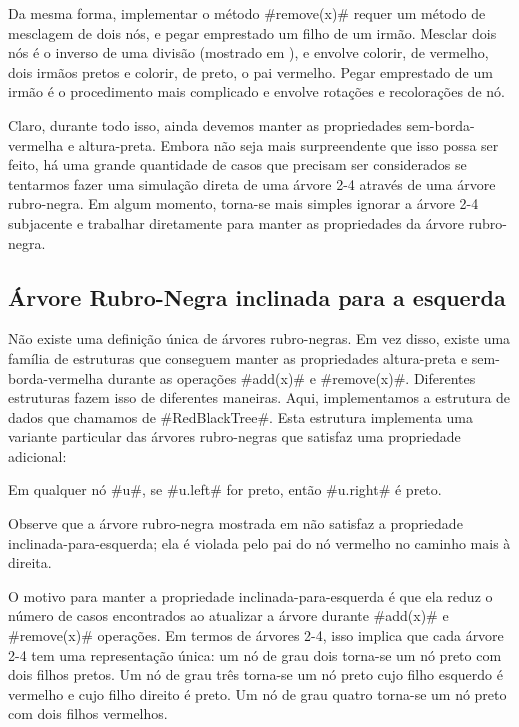 Da mesma forma, implementar o método #remove(x)# requer um método de mesclagem 
de dois nós, e pegar emprestado um filho de um irmão. Mesclar dois nós é o inverso de
uma divisão (mostrado em ), e envolve colorir, de vermelho, dois
irmãos pretos e colorir, de preto, o pai vermelho. Pegar emprestado de
um irmão é o procedimento mais complicado e envolve
rotações e recolorações de nó.

Claro, durante todo isso, ainda devemos manter as propriedades sem-borda-vermelha
e altura-preta. Embora não seja mais surpreendente que isso possa ser feito,
há uma grande quantidade de casos que precisam ser considerados se tentarmos 
fazer uma simulação direta de uma árvore 2-4 através de uma
árvore rubro-negra. Em algum momento, torna-se mais simples ignorar a
árvore 2-4 subjacente e trabalhar diretamente para manter as propriedades
da árvore rubro-negra.

\subsection{Árvore Rubro-Negra inclinada para a esquerda}

%
%
Não existe uma definição única de árvores rubro-negras. Em vez disso, existe
uma família de estruturas que conseguem manter as propriedades altura-preta
e sem-borda-vermelha durante as operações #add(x)# e #remove(x)#. 
Diferentes estruturas fazem isso de diferentes maneiras.
Aqui, implementamos a estrutura de dados que chamamos de #RedBlackTree#.
%
Esta estrutura implementa uma variante particular das árvores rubro-negras que
satisfaz uma propriedade adicional:
\begin{prp}
	Em qualquer nó #u#, se #u.left# for preto, então #u.right# é preto.
\end{prp}
Observe que a árvore rubro-negra mostrada em  não
satisfaz a propriedade inclinada-para-esquerda; ela é violada pelo pai do
nó vermelho no caminho mais à direita.

O motivo para manter a propriedade inclinada-para-esquerda é que ela reduz
o número de casos encontrados ao atualizar a árvore durante #add(x)#
e #remove(x)# operações. Em termos de árvores 2-4, isso implica que cada
árvore 2-4 tem uma representação única: um nó de grau dois torna-se
um nó preto com dois filhos pretos. Um nó de grau três torna-se
um nó preto cujo filho esquerdo é vermelho e cujo filho direito é preto.
Um nó de grau quatro torna-se um nó preto com dois filhos vermelhos.

